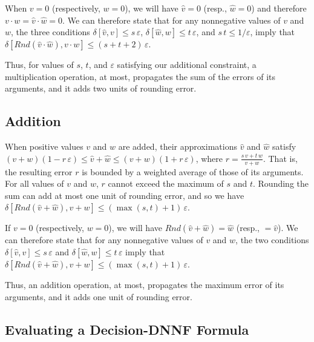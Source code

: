 \documentclass[letterpaper,USenglish,cleveref, autoref, thm-restate]{lipics-v2021}
\newcommand{\approximate}[1]{\hat{#1}}
\newcommand{\approxv}{\approximate{v}}
\newcommand{\approxw}{\approximate{w}}
\newcommand{\round}{\mathit{Rnd}}
\newcommand{\aerror}{\delta}
\newcommand{\roundepsilon}{\varepsilon}
\begin{document}
When $v=0$ (respectively, $w=0$), we will have $\approxv=0$ (resp., $\approxw = 0$) and therefore $v \cdot w = \approxv \cdot \approxw = 0$.
We can therefore state that  for any nonnegative values of $v$ and $w$, the three conditions $\aerror[\approxv, v] \leq s\,\roundepsilon$,
$\aerror[\approxw, w] \leq t\,\roundepsilon$, and
$s\,t \leq 1/\roundepsilon$, imply that
$\aerror[\round(\approxv \cdot \approxw), v \cdot w] \leq (s+t+2)\,\roundepsilon$.

Thus, for values of $s$, $t$, and $\roundepsilon$ satisfying our
additional constraint, a multiplication operation, at most, propagates
the sum of the errors of its arguments, and it adds two units of
rounding error.

\subsection{Addition}

When positive values $v$ and $w$ are added, their approximations  $\approxv$ and $\approxw$ satisfy
$(v + w) (1 - r\,\roundepsilon) \leq \approxv + \approxw \leq (v + w) (1 + r\,\roundepsilon)$, where $r = \frac{s\,v + t\,w}{v+w}$.  That is, the resulting error $r$ is bounded by a weighted average
of those of its arguments.  For all values of $v$ and $w$, $r$ cannot exceed the maximum of $s$ and $t$.
Rounding the sum can add at most one unit of rounding error, and so we have
$\aerror[\round(\approxv + \approxw), v + w] \leq (\max(s,t)+1)\,\roundepsilon$.

If $v = 0$ (respectively, $w = 0$), we will have $\round(\approxv + \approxw) = \approxw$ (resp., $= \approxv$).
We can therefore state that for any nonnegative values of $v$ and $w$, the two conditions $\aerror[\approxv, v] \leq s\,\roundepsilon$ and
$\aerror[\approxw, w] \leq t\,\roundepsilon$ imply that 
$\aerror[\round(\approxv + \approxw), v + w] \leq (\max(s,t)+1)\,\roundepsilon$.

Thus, an addition operation, at most, propagates the maximum error of its arguments, and it adds one unit of rounding error.

\subsection{Evaluating a Decision-DNNF Formula}
\label{sect:error:formula}
\end{document}
